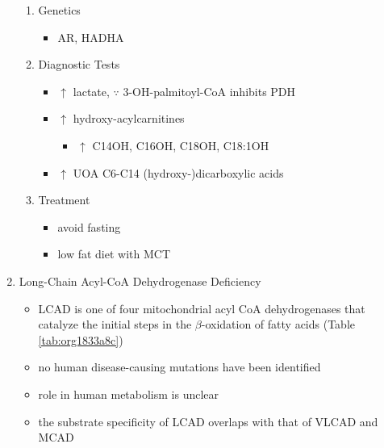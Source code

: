\documentclass{scrartcl}
\begin{document}
\begin{enumerate}
\begin{enumerate}
\item Genetics
\label{sec:org32aba3a}
\begin{itemize}
\item AR, HADHA
\end{itemize}

\item Diagnostic Tests
\label{sec:orge7be20c}
\begin{itemize}
\item \(\uparrow\) lactate, \(\because\) 3-OH-palmitoyl-CoA inhibits PDH
\item \(\uparrow\) hydroxy-acylcarnitines
\begin{itemize}
\item \(\uparrow\) C14OH, C16OH, C18OH, C18:1OH
\end{itemize}
\item \(\uparrow\) UOA C6-C14 (hydroxy-)dicarboxylic acids
\end{itemize}

\item Treatment
\label{sec:org8599e92}
\begin{itemize}
\item avoid fasting
\item low fat diet with MCT
\end{itemize}
\end{enumerate}
\item Long-Chain Acyl-CoA Dehydrogenase Deficiency
\label{sec:orgb54e2e2}
\begin{itemize}
\item LCAD is one of four mitochondrial acyl CoA dehydrogenases that
catalyze the initial steps in the \(\beta\)-oxidation of fatty acids
(Table \ref{tab:org1833a8c})
\item no human disease-causing mutations have been identified
\item role  in  human  metabolism  is unclear
\item the substrate specificity of LCAD overlaps with that of
VLCAD and MCAD
\end{itemize}


\end{enumerate}
\end{document}
